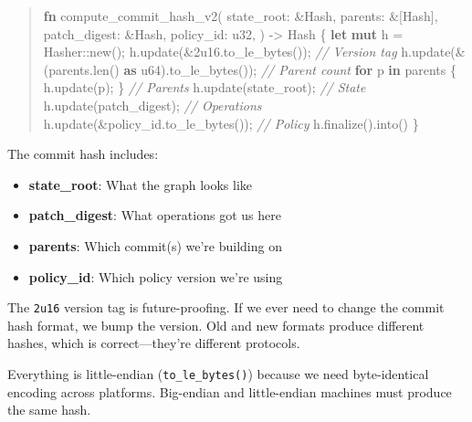 \documentclass[11pt]{book}
\newenvironment{Shaded}{\begin{quote}}{\end{quote}}
\newcommand{\BuiltInTok}[1]{\textcolor[rgb]{0.00,0.50,0.00}{#1}}
\newcommand{\CommentTok}[1]{\textcolor[rgb]{0.38,0.63,0.69}{\textit{#1}}}
\newcommand{\ControlFlowTok}[1]{\textcolor[rgb]{0.00,0.44,0.13}{\textbf{#1}}}
\newcommand{\DataTypeTok}[1]{\textcolor[rgb]{0.56,0.13,0.00}{#1}}
\newcommand{\DecValTok}[1]{\textcolor[rgb]{0.25,0.63,0.44}{#1}}
\newcommand{\KeywordTok}[1]{\textcolor[rgb]{0.00,0.44,0.13}{\textbf{#1}}}
\newcommand{\NormalTok}[1]{#1}
\newcommand{\OperatorTok}[1]{\textcolor[rgb]{0.40,0.40,0.40}{#1}}
\newcommand{\PreprocessorTok}[1]{\textcolor[rgb]{0.74,0.48,0.00}{#1}}
\newenvironment{directors}
{\begin{mdframed}[
  linecolor=blue!60,
  linewidth=2pt,
  leftline=true,
  rightline=false,
  topline=false,
  bottomline=false,
  backgroundcolor=blue!3,
  innerleftmargin=12pt,
  innerrightmargin=10pt,
  innertopmargin=8pt,
  innerbottommargin=8pt,
  skipabove=12pt,
  skipbelow=12pt
]\small\sffamily\color{blue!70!black}}
{\end{mdframed}}
\begin{document}
\begin{Shaded}
\begin{Highlighting}[]
\KeywordTok{fn}\NormalTok{ compute\_commit\_hash\_v2(}
\NormalTok{    state\_root}\OperatorTok{:} \OperatorTok{\&}\BuiltInTok{Hash}\OperatorTok{,}
\NormalTok{    parents}\OperatorTok{:} \OperatorTok{\&}\NormalTok{[}\BuiltInTok{Hash}\NormalTok{]}\OperatorTok{,}
\NormalTok{    patch\_digest}\OperatorTok{:} \OperatorTok{\&}\BuiltInTok{Hash}\OperatorTok{,}
\NormalTok{    policy\_id}\OperatorTok{:} \DataTypeTok{u32}\OperatorTok{,}
\NormalTok{) }\OperatorTok{{-}\textgreater{}} \BuiltInTok{Hash} \OperatorTok{\{}
    \KeywordTok{let} \KeywordTok{mut}\NormalTok{ h }\OperatorTok{=} \BuiltInTok{Hasher}\PreprocessorTok{::}\NormalTok{new()}\OperatorTok{;}
\NormalTok{    h}\OperatorTok{.}\NormalTok{update(}\OperatorTok{\&}\DecValTok{2u16}\OperatorTok{.}\NormalTok{to\_le\_bytes())}\OperatorTok{;}              \CommentTok{// Version tag}
\NormalTok{    h}\OperatorTok{.}\NormalTok{update(}\OperatorTok{\&}\NormalTok{(parents}\OperatorTok{.}\NormalTok{len() }\KeywordTok{as} \DataTypeTok{u64}\NormalTok{)}\OperatorTok{.}\NormalTok{to\_le\_bytes())}\OperatorTok{;}  \CommentTok{// Parent count}
    \ControlFlowTok{for}\NormalTok{ p }\KeywordTok{in}\NormalTok{ parents }\OperatorTok{\{}\NormalTok{ h}\OperatorTok{.}\NormalTok{update(p)}\OperatorTok{;} \OperatorTok{\}}                 \CommentTok{// Parents}
\NormalTok{    h}\OperatorTok{.}\NormalTok{update(state\_root)}\OperatorTok{;}                       \CommentTok{// State}
\NormalTok{    h}\OperatorTok{.}\NormalTok{update(patch\_digest)}\OperatorTok{;}                     \CommentTok{// Operations}
\NormalTok{    h}\OperatorTok{.}\NormalTok{update(}\OperatorTok{\&}\NormalTok{policy\_id}\OperatorTok{.}\NormalTok{to\_le\_bytes())}\OperatorTok{;}         \CommentTok{// Policy}
\NormalTok{    h}\OperatorTok{.}\NormalTok{finalize()}\OperatorTok{.}\NormalTok{into()}
\OperatorTok{\}}
\end{Highlighting}
\end{Shaded}

\begin{directors}
The commit hash includes:
\begin{itemize}
\item \textbf{state\_root}: What the graph looks like
\item \textbf{patch\_digest}: What operations got us here
\item \textbf{parents}: Which commit(s) we're building on
\item \textbf{policy\_id}: Which policy version we're using
\end{itemize}

The \texttt{2u16} version tag is future-proofing. If we ever need to change the commit hash format, we bump the version. Old and new formats produce different hashes, which is correct---they're different protocols.

Everything is little-endian (\texttt{to\_le\_bytes()}) because we need byte-identical encoding across platforms. Big-endian and little-endian machines must produce the same hash.
\end{directors}
\end{document}
